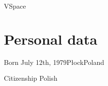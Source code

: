

    {VSpace}

\section{Personal data}

\cventry
    {Born}
    {July 12th, 1979}{Płock}{Poland}{}{}

\cventry
    {Citizenship}
    {Polish}{}{}{}{}


